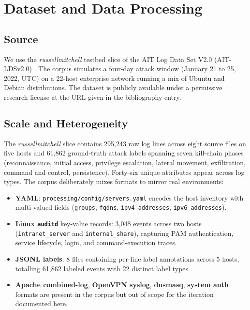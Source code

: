 \section{Dataset and Data Processing}
\label{sec:dataset}

\subsection{Source}
We use the \emph{russellmitchell} testbed slice of the AIT Log Data Set V2.0
(AIT-LDSv2.0) \cite{landauer2022maintainable, ait2024dataset}. The corpus
simulates a four-day attack window (January 21 to 25, 2022, UTC) on a 22-host
enterprise network running a mix of Ubuntu and Debian distributions. The
dataset is publicly available under a permissive research license at the
URL given in the bibliography entry.

\subsection{Scale and Heterogeneity}
The \emph{russellmitchell} slice contains 295{,}243 raw log lines across
eight source files on five hosts and 61{,}862 ground-truth attack labels
spanning seven kill-chain phases (reconnaissance, initial access, privilege
escalation, lateral movement, exfiltration, command and control,
persistence). Forty-six unique attributes appear across log types. The
corpus deliberately mixes formats to mirror real environments:
\begin{itemize}
  \item \textbf{YAML}: \texttt{processing/config/servers.yaml} encodes the
    host inventory with multi-valued fields (\texttt{groups},
    \texttt{fqdns}, \texttt{ipv4\_addresses}, \texttt{ipv6\_addresses}).
  \item \textbf{Linux \texttt{auditd}} key-value records: 3{,}048 events
    across two hosts (\texttt{intranet\_server} and
    \texttt{internal\_share}), capturing PAM authentication, service
    lifecycle, login, and command-execution traces.
  \item \textbf{JSONL labels}: 8 files containing per-line label
    annotations across 5 hosts, totalling 61{,}862 labeled events with 22
    distinct label types.
  \item \textbf{Apache combined-log}, \textbf{OpenVPN syslog},
    \textbf{dnsmasq}, \textbf{system auth} formats are present in the
    corpus but out of scope for the iteration documented here.
\end{itemize}

